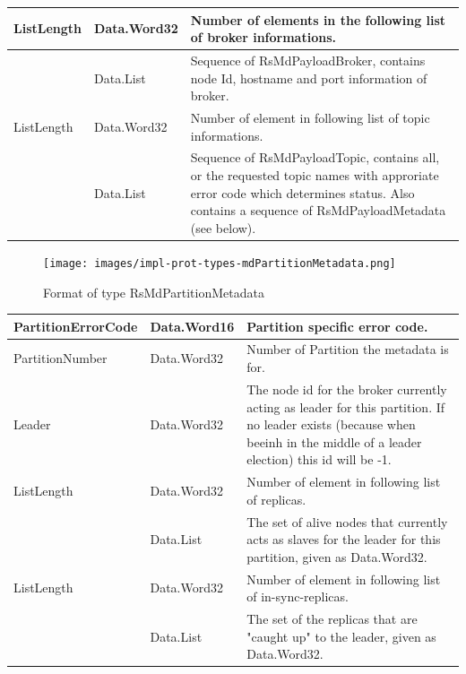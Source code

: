 \begin{table}[H]
\centering
\begin{tabular}{ l  l  p{8cm} }
\hline
ListLength        & Data.Word32     & Number of elements in the following list of broker
informations.\\ \hline
[RsMdPayloadBroker] & Data.List     & Sequence of RsMdPayloadBroker, contains
node Id, hostname and port information of broker.  \\ \hline
ListLength        & Data.Word32     & Number of element in following list of
topic informations.\\ \hline
[RsMdPayloadTopic] & Data.List     & Sequence of RsMdPayloadTopic, contains all,
or the requested topic names with approriate error code which determines status.
Also contains a sequence of RsMdPayloadMetadata (see below). \\ \hline
\end{tabular}
\end{table}

\begin{figure}[H]
    \centering
    \texttt{[image: images/impl-prot-types-mdPartitionMetadata.png]}
    \caption{Format of type RsMdPartitionMetadata} 
\end{figure}

\begin{table}[H]
\centering
\begin{tabular}{ l  l  p{8cm} }
\hline
PartitionErrorCode  & Data.Word16 & Partition specific error code.                                                          \\ \hline
PartitionNumber     & Data.Word32 & Number of Partition the metadata is for.                                               \\ \hline
Leader              & Data.Word32 & The node id for the broker currently acting as leader for this partition.
If no leader exists (because when beeinh in the middle of
a leader election) this id will be -1.                                                                \\ \hline
ListLength        & Data.Word32     & Number of element in following list of
replicas.                                                  \\ \hline
[Replicas]         & Data.List & The set of alive nodes that currently acts as
                       slaves for the leader for this partition, given as
                       Data.Word32.                                                                                        \\ \hline
ListLength        & Data.Word32     & Number of element in following list of
                       in-sync-replicas.                                                  \\ \hline
[Isr]   & Data.List   & The set of the replicas that are "caught up" to
                       the leader, given as Data.Word32.        \\ \hline
\end{tabular}
\end{table}


